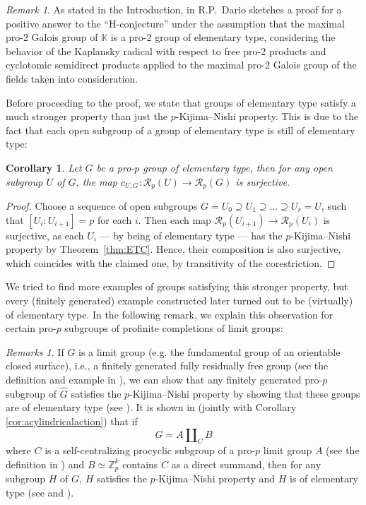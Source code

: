 \documentclass{amsart}
\newtheorem{cor}[thm]{Corollary}
\theoremstyle{definition}
\theoremstyle{remark}
\newtheorem{rem}[thm]{Remark}
\newtheorem{rems}[thm]{Remarks}
\newcommand{\KK}{\mathbb{K}}
\newcommand{\ZZ}{\mathbb{Z}}
\newcommand{\calR}{\mathcal{R}}
\newcommand{\K}{\KK}
\begin{document}
\begin{rem}
    As stated in the Introduction, in \cite{Dario} R.P.~Dario sketches a proof for a positive answer to the ``H-conjecture'' under the assumption that the maximal pro-2 Galois group of $\K$ is a pro-2 group of elementary type, considering the behavior of the Kaplansky radical with respect to free pro-2 products and cyclotomic semidirect products applied to the maximal pro-2 Galois group of the fields taken into consideration.
\end{rem}
Before proceeding to the proof, we state that groups of elementary type satisfy a much stronger property than just the $p$-Kijima--Nishi property. This is due to the fact that each open subgroup of a group of elementary type is still of elementary type:
\begin{cor}
    Let $G$ be a pro-$p$ group of elementary type, then for any open subgroup $U$ of $G$, the map $c_{U,G}:\calR_p(U)\to \calR_p(G)$ is surjective.
\end{cor}
\begin{proof}
    Choose a sequence of open subgroups $G=U_0\supseteq U_1\supseteq ...\supseteq U_r=U$, such that $[U_i:U_{i+1}]=p$ for each $i$. Then each map $\calR_p(U_{i+1})\to \calR_p(U_i)$ is surjective, as each $U_i$ --- by being of elementary type --- has the $p$-Kijima--Nishi property by Theorem~\ref{thm:ETC}. Hence, their composition is also surjective, which coincides with the claimed one, by transitivity of the corestriction.
\end{proof}
We tried to find more examples of groups satisfying this stronger property, but every (finitely generated) example constructed later turned out to be (virtually) of elementary type. In the following remark, we explain this observation for certain pro-$p$ subgroups of profinite completions of limit groups:
\begin{rems}
If $G$ is a limit group (e.g. the fundamental group of an orientable closed surface), i.e., a finitely generated fully residually free group (see the definition and example in \cite{SZ26}), we can show that any finitely generated pro-$p$ subgroup of $\widehat{G}$ satisfies the $p$-Kijima--Nishi property by showing that these groups are of elementary type (see \cite{ZZ19}). It is shown in \cite[Lem. 3.13]{SZ26} (jointly with Corollary \ref{cor:acylindricalaction}) that if
$$G = A \amalg_C B$$
where $C$ is a self-centralizing procyclic subgroup of a pro-$p$ limit group $A$ (see the definition in \cite{SZ26}) and $B \simeq \ZZ_p^k$ contains $C$ as a direct summand, then for any subgroup $H$ of $G$, $H$ satisfies the $p$-Kijima--Nishi property and $H$ is of elementary type (see \cite{WZ17} and \cite[Thm. 1.4]{SZ26}). 
\end{rems}
\end{document}
